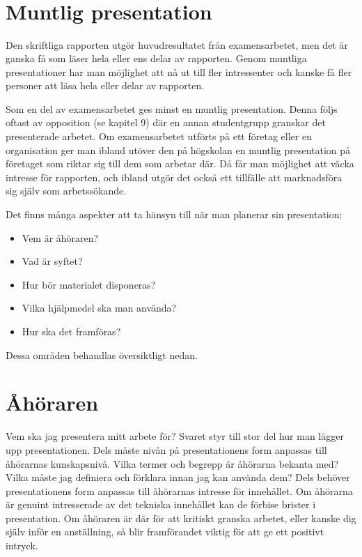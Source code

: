 \section{\texorpdfstring{\\
}{ }}\label{section}

\section{Muntlig presentation}\label{muntlig-presentation}

Den skriftliga rapporten utgör huvudresultatet från examensarbetet, men
det är ganska få som läser hela eller ens delar av rapporten. Genom
muntliga presentationer har man möjlighet att nå ut till fler
intressenter och kanske få fler personer att läsa hela eller delar av
rapporten.

Som en del av examensarbetet ges minst en muntlig presentation. Denna
följs oftast av opposition (se kapitel 9) där en annan studentgrupp
granskar det presenterade arbetet. Om examensarbetet utförts på ett
företag eller en organisation ger man ibland utöver den på högskolan en
muntlig presentation på företaget som riktar sig till dem som arbetar
där. Då får man möjlighet att väcka intresse för rapporten, och ibland
utgör det också ett tillfälle att marknadsföra sig själv som
arbetssökande.

Det finns många aspekter att ta hänsyn till när man planerar sin
presentation:

\begin{itemize}
\item
  Vem är åhöraren?
\item
  Vad är syftet?
\item
  Hur bör materialet disponeras?
\item
  Vilka hjälpmedel ska man använda?
\item
  Hur ska det framföras?
\end{itemize}

Dessa områden behandlas översiktligt nedan.

\section{Åhöraren}\label{uxe5huxf6raren}

Vem ska jag presentera mitt arbete för? Svaret styr till stor del hur
man lägger upp presentationen. Dels måste nivån på presentationens form
anpassas till åhörarnas kunskapsnivå. Vilka termer och begrepp är
åhörarna bekanta med? Vilka måste jag definiera och förklara innan jag
kan använda dem? Dels behöver presentationens form anpassas till
åhörarnas intresse för innehållet. Om åhörarna är genuint intresserade
av det tekniska innehållet kan de förbise brister i presentation. Om
åhöraren är där för att kritiskt granska arbetet, eller kanske dig själv
inför en anställning, så blir framförandet viktig för att ge ett
positivt intryck.

